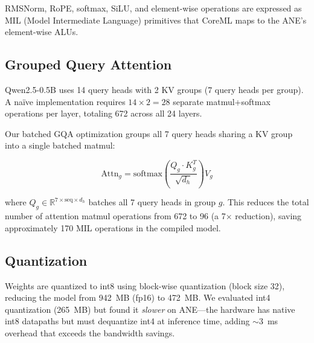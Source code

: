 \documentclass[11pt,twocolumn]{article}
\begin{document}
RMSNorm, RoPE, softmax, SiLU, and element-wise operations are
expressed as MIL (Model Intermediate Language) primitives that CoreML
maps to the ANE's element-wise ALUs.

\subsection{Grouped Query Attention}

Qwen2.5-0.5B uses 14 query heads with 2 KV groups (7 query heads per
group). A na\"ive implementation requires $14 \times 2 = 28$ separate
matmul+softmax operations per layer, totaling 672 across all 24
layers.

Our batched GQA optimization groups all 7 query heads sharing a KV
group into a single batched matmul:

\begin{equation}
\text{Attn}_g = \text{softmax}\!\left(\frac{Q_g \cdot K_g^T}{\sqrt{d_h}}\right) V_g
\end{equation}

where $Q_g \in \mathbb{R}^{7 \times \text{seq} \times d_h}$ batches
all 7 query heads in group $g$. This reduces the total number of
attention matmul operations from 672 to 96 (a 7$\times$ reduction),
saving approximately 170 MIL operations in the compiled model.

\subsection{Quantization}

Weights are quantized to int8 using block-wise quantization (block
size 32), reducing the model from 942~MB (fp16) to 472~MB. We
evaluated int4 quantization (265~MB) but found it \emph{slower} on
ANE---the hardware has native int8 datapaths but must dequantize int4
at inference time, adding $\sim$3~ms overhead that exceeds the
bandwidth savings.
\end{document}
